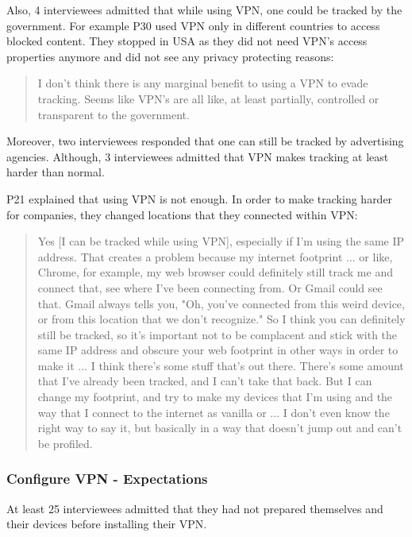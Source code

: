 Also, 4 interviewees admitted that while using VPN, one could be tracked by
the government. For example P30 used VPN only in different countries to access
blocked content. They stopped in USA as they did not need VPN's access
properties anymore and did not see any privacy protecting reasons:

\begin{quote}I don't think there is any marginal benefit to using a VPN to
evade tracking. Seems like VPN's are all like, at least partially, controlled
or transparent to the government.\end{quote}

 Moreover, two interviewees responded that one can still be tracked by
 advertising agencies. Although, 3 interviewees admitted that VPN makes
 tracking at least harder than normal. 

P21 explained that using VPN is not enough. In order to make tracking harder
for companies, they changed locations that they connected within VPN:
\begin{quote}Yes [I can be tracked while using VPN], especially if I'm using
the same IP address. That creates a problem because my internet footprint ...
or like, Chrome, for example, my web browser could definitely still track me
and connect that, see where I've been connecting from. Or Gmail could see
that. Gmail always tells you, "Oh, you've connected from this weird device, or
from this location that we don't recognize." So I think you can definitely
still be tracked, so it's important not to be complacent and stick with the
same IP address and obscure your web footprint in other ways in order to make
it ... I think there's some stuff that's out there. There's some amount that
I've already been tracked, and I can't take that back. But I can change my
footprint, and try to make my devices that I'm using and the way that I
connect to the internet as vanilla or ... I don't even know the right way to
say it, but basically in a way that doesn't jump out and can't be
profiled.\end{quote}


\subsubsection{Configure VPN - Expectations} At least 25 interviewees admitted
that they had not prepared themselves and their devices before installing
their VPN.

